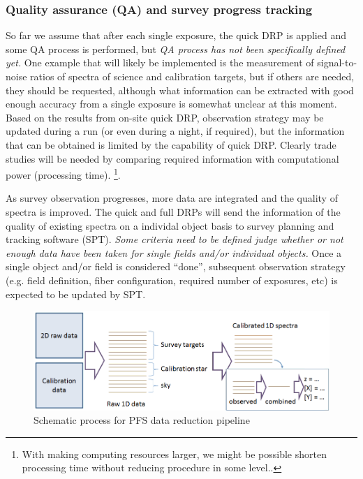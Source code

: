 \documentclass[a4paper,notitlepage]{article}
\begin{document}
\subsubsection{Quality assurance (QA) and survey progress tracking}

So far we assume that after each single exposure, the quick DRP is
applied and some QA process is performed, but {\it QA process has not
been specifically defined yet.}  One example that will likely be
implemented is the measurement of signal-to-noise ratios of spectra of
science and calibration targets, but if others are needed, they should
be requested, although what information can be extracted with good
enough accuracy from a single exposure is somewhat unclear at this
moment. Based on the results from on-site quick DRP, observation
strategy may be updated during a run (or even during a night, if
required), but the information that can be obtained is limited by the
capability of quick DRP. Clearly trade studies will be needed by
comparing required information with computational power (processing
time). \footnote{With making computing resources larger, we might be
possible shorten processing time without reducing procedure in some
level..}.

As survey observation progresses, more data are integrated and the
quality of spectra is improved. The quick and full DRPs will send the
information of the quality of existing spectra on a individal object
basis to survey planning and tracking software (SPT). {\it Some criteria
need to be defined judge whether or not enough data have been taken for
single fields and/or individual objects.} Once a single object and/or
field is considered ``done'', subsequent observation strategy
(e.g. field definition, fiber configuration, required number of
exposures, etc) is expected to be updated by SPT.

\begin{figure}[htb]
  \begin{center}
    \includegraphics[width=.75\linewidth]{sciops-scireq-drp-slide.png}
  \end{center}
  \caption{Schematic process for PFS data reduction pipeline}
  \label{fig:sciops-scireq-drp-slide}
\end{figure}
\end{document}
